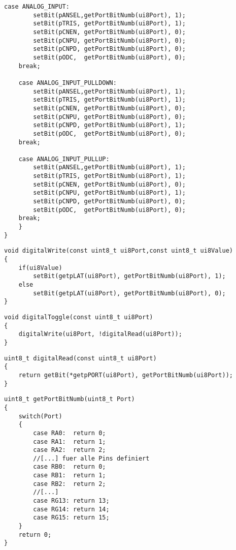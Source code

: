 \begin{lstlisting}[frame=htrbl, caption={pinMode() Funktion}, label={lst:pinmode}]
	case ANALOG_INPUT:
		setBit(pANSEL,getPortBitNumb(ui8Port), 1);
		setBit(pTRIS, getPortBitNumb(ui8Port), 1);      
		setBit(pCNEN, getPortBitNumb(ui8Port), 0);
		setBit(pCNPU, getPortBitNumb(ui8Port), 0);
		setBit(pCNPD, getPortBitNumb(ui8Port), 0);
		setBit(pODC,  getPortBitNumb(ui8Port), 0);
	break;
	
	case ANALOG_INPUT_PULLDOWN:
		setBit(pANSEL,getPortBitNumb(ui8Port), 1);
		setBit(pTRIS, getPortBitNumb(ui8Port), 1);      
		setBit(pCNEN, getPortBitNumb(ui8Port), 0);
		setBit(pCNPU, getPortBitNumb(ui8Port), 0);
		setBit(pCNPD, getPortBitNumb(ui8Port), 1);
		setBit(pODC,  getPortBitNumb(ui8Port), 0);
	break;   
	
	case ANALOG_INPUT_PULLUP:
		setBit(pANSEL,getPortBitNumb(ui8Port), 1);
		setBit(pTRIS, getPortBitNumb(ui8Port), 1);      
		setBit(pCNEN, getPortBitNumb(ui8Port), 0);
		setBit(pCNPU, getPortBitNumb(ui8Port), 1);
		setBit(pCNPD, getPortBitNumb(ui8Port), 0);
		setBit(pODC,  getPortBitNumb(ui8Port), 0);
	break;
	}
}
\end{lstlisting}

\begin{lstlisting}[frame=htrbl, caption={digitalWrite() Funktion}, label={lst:digitalwrite}]
void digitalWrite(const uint8_t ui8Port,const uint8_t ui8Value)
{  
	if(ui8Value)
		setBit(getpLAT(ui8Port), getPortBitNumb(ui8Port), 1);
	else
		setBit(getpLAT(ui8Port), getPortBitNumb(ui8Port), 0);
}
\end{lstlisting}

\begin{lstlisting}[frame=htrbl, caption={digitalToggle() Funktion}, label={lst:digitalToggle}]
void digitalToggle(const uint8_t ui8Port)
{
	digitalWrite(ui8Port, !digitalRead(ui8Port));
}
\end{lstlisting}

\begin{lstlisting}[frame=htrbl, caption={digitalRead() Funktion}, label={lst:digitalRead}]
uint8_t digitalRead(const uint8_t ui8Port)
{
	return getBit(*getpPORT(ui8Port), getPortBitNumb(ui8Port));
}
\end{lstlisting}

\begin{lstlisting}[frame=htrbl, caption={getPortBitNumb() Funktion}, label={lst:getPortBitNumb}]
uint8_t getPortBitNumb(uint8_t Port)
{
	switch(Port)
	{
		case RA0:  return 0;
		case RA1:  return 1;
		case RA2:  return 2;
		//[...] fuer alle Pins definiert
		case RB0:  return 0;
		case RB1:  return 1;
		case RB2:  return 2;
		//[...]
		case RG13: return 13;
		case RG14: return 14;
		case RG15: return 15;       
	}
	return 0;
}
\end{lstlisting}


